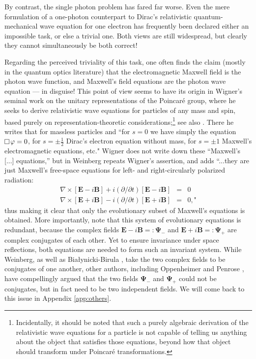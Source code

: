 \documentclass[12pt]{article}
\theoremstyle{definition}
\numberwithin{equation}{section}
\newcommand{\bB}{\mathbf{B}}
\newcommand{\bE}{\mathbf{E}}
\newcommand{\p}{\partial}
\newcommand{\bna}{\begin{eqnarray}}
\newcommand{\ena}{\end{eqnarray}}
\newcommand{\dal}{\raisebox{3pt}{\fbox{}}\,}
\begin{document}
 By contrast, the single photon problem has fared far worse.
 Even the mere formulation of a one-photon counterpart to Dirac's relativistic quantum-mechanical wave equation for one electron
has frequently been declared either an impossible task, or else a trivial one.
 Both views are still widespread, but clearly they cannot simultaneously be both correct!
  
 Regarding the perceived triviality of this task,  one often finds the claim (mostly in the quantum optics literature) that the electromagnetic 
Maxwell field is the photon wave function, and Maxwell's field equations are the photon wave equation --- in disguise!  
This point of view seems to have its origin in Wigner's seminal work \cite{Wig1939} on the unitary representations of the Poincar\'e group,
 where he seeks to derive relativistic wave equations for particles of any mass and spin, based purely on representation-theoretic 
considerations;\footnote{Incidentally, it should be noted that such a purely algebraic derivation of the 
relativistic wave equations for a particle is not capable of telling us anything about the object that satisfies those equations, beyond 
how that object should transform under Poincar\'e transformations.\vspace{-10pt}}
 see also \cite{BarWig1948}.
  There he writes that for massless particles and ``for $s = 0$ we have simply the equation $\dal \varphi = 0$,
for $s = \pm\frac{1}{2}$ Dirac's electron equation without mass, for $s = \pm 1$ Maxwell's electromagnetic equations, etc." 
 Wigner does not write down these ``Maxwell's [...] equations,'' but in \cite{Wei1964} Weinberg repeats Wigner's assertion, 
and adds ``...they are just Maxwell's free-space equations for left- and right-circularly polarized radiation:
\bna
\nabla \times [\bE - i\bB] + i(\p/\p t)[\bE - i\bB] & = & 0\\
\nabla \times [\bE + i \bB] - i(\p/\p t)[\bE + i\bB] & = & 0,\mbox{"}
\ena
thus making it clear that 
    only the evolutionary subset of Maxwell's equations is obtained.
 More importantly, note that this system of evolutionary equations is redundant, because
the complex fields $\bE - i\bB=:\boldsymbol{\Psi}_-$ and $\bE + i\bB=:\boldsymbol{\Psi}_+$ 
are complex conjugates of each other.
 Yet to ensure invariance under space reflections, both equations are needed to form such an invariant system. 
 While Weinberg, as well as Bia{\l}ynicki-Birula \cite{IBBphotonREV}, take the two complex fields 
to be conjugates of one another, other authors, including Oppenheimer \cite{OppiPHOTON} and Penrose \cite{Pen1976}, 
have compellingly argued that the two fields $\boldsymbol{\Psi}_-$ and $\boldsymbol{\Psi}_+$ 
could not be conjugates, but in fact need to be two independent fields. 
 We will come back to this issue in Appendix \ref{app:others}.
\end{document}

